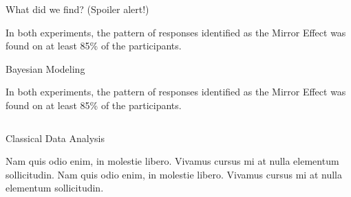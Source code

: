 \documentclass[final]{beamer}
\newlength{\onecolwid}
\newlength{\twocolwid}
\begin{document}
\begin{frame}[t]
\begin{columns}[t]
\begin{column}{\twocolwid}
\begin{columns}[t,totalwidth=\twocolwid]
\begin{column}{\twocolwid}
\end{column} %

\end{columns} %

\begin{alertblock}{What did we find? (Spoiler alert!)}

In both experiments, the pattern of responses identified as the Mirror Effect was found on at least 85\% of the participants.

\end{alertblock} 


\begin{alertblock}{Bayesian Modeling}

In both experiments, the pattern of responses identified as the Mirror Effect was found on at least 85\% of the participants.

\end{alertblock} 




\begin{columns}[t,totalwidth=\twocolwid] %

\begin{column}{\onecolwid} %


\begin{block}{Classical Data Analysis}

Nam quis odio enim, in molestie libero. Vivamus cursus mi at nulla elementum sollicitudin. Nam quis odio enim, in molestie libero. Vivamus cursus mi at nulla elementum sollicitudin.


\end{block}
\end{column}
\end{columns}
\end{column}
\end{columns}
\end{frame}
\end{document}
